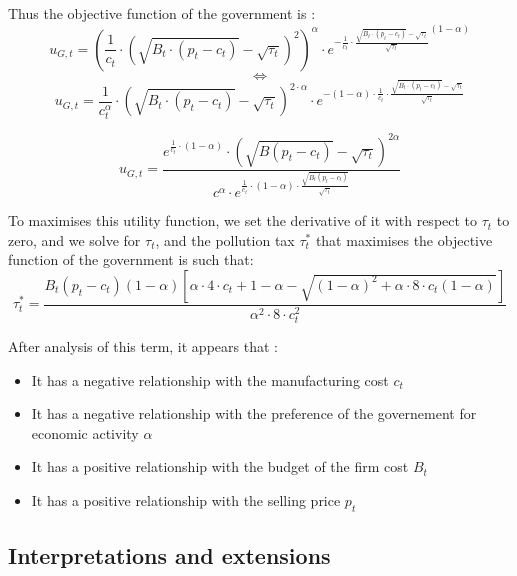 \documentclass{article}
\begin{document}
Thus the objective function of the government is : 
$${u_{G,t}=\left(\frac{1}{c_{t}}\cdot\left({\sqrt{B_{t}\cdot (p_{t}-c_{t})}-\sqrt{\tau_{t}}}\right)^{2}\right)^{\alpha}\cdot {e^{-\frac{1}{c_{t}}\cdot \frac{\sqrt{B_{t}\cdot(p_{t}-c_{t})}-\sqrt{\tau_{t}}}{\sqrt{\tau_{t}}}}}^{(1-\alpha)}}$$
$$\iff$$
$${u_{G,t}=\frac{1}{c_{t}^\alpha}\cdot\left({\sqrt{B_{t}\cdot (p_{t}-c_{t})}-\sqrt{\tau_{t}}}\right)^{2\cdot\alpha}\cdot {e^{-(1-\alpha)\cdot\frac{1}{c_{t}}\cdot \frac{\sqrt{B_{t}\cdot(p_{t}-c_{t})}-\sqrt{\tau_{t}}}{\sqrt{\tau_{t}}}}}}$$

\begin{equation}
    u_{G,t}=\frac{e^{\frac{1}{c_{t}}\cdot\left(1-\alpha\right)}\cdot\left(\sqrt{B(p_{t}-c_{t})}-\sqrt{\tau_{t}}\right)^{2\alpha}}{c^{\alpha}\cdot e^{\frac{1}{c_{t}}\cdot(1-\alpha)\cdot\frac{\sqrt{B_{t}(p_{t}-c_{t})}}{\sqrt{\tau_{t}}}}}
\end{equation}

To maximises this utility function, we set the derivative of it with respect to $\tau_{t}$ to zero, and we solve for $\tau_{t}$, and the pollution tax $\tau_{t}^{*}$ that maximises the objective function of the government is such that\footnotemark[2] : 
\begin{equation}
    \tau_{t}^{*}=\frac{B_{t}\left(p_{t}-c_{t}\right)(1-\alpha)\left[{\alpha \cdot 4\cdot c_{t}+1-\alpha}-\sqrt{(1-\alpha)^{2}+\alpha\cdot8\cdot c_{t}(1-\alpha)}\right]} {\alpha^{2} \cdot 8\cdot c_{t}^{2}}
\end{equation}

After analysis of this term, it appears that : 
\begin{itemize}
    \item It has a negative relationship with the manufacturing cost $c_{t}$
    \item It has a negative relationship with the preference of the governement for economic activity $\alpha$
    \item It has a positive relationship with the budget of the firm cost $B_{t}$
    \item It has a positive relationship with the selling price $p_{t}$
\end{itemize}

\subsection{Interpretations and extensions}
\end{document}
